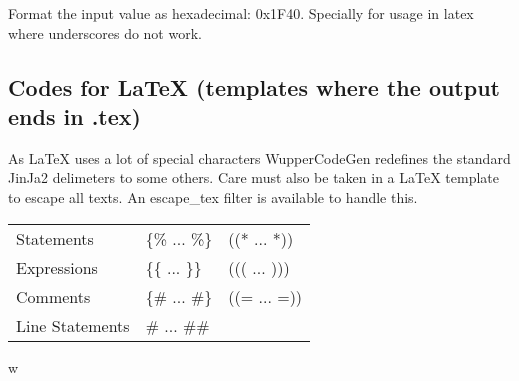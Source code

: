 \documentclass[letterpaper,10pt,english]{sphinxmanual}
\begin{document}
\begin{fulllineitems}
\label{\detokenize{developer:wuppercodegen.filter.xhex}}
Format the input value as hexadecimal: 0x1F40. Specially for usage in latex where underscores do not work.

\end{fulllineitems}



\subsection{Codes for LaTeX (templates where the output ends in .tex)}
\label{\detokenize{developer:codes-for-latex-templates-where-the-output-ends-in-tex}}
As LaTeX uses a lot of special characters WupperCodeGen redefines
the standard JinJa2 delimeters to some others. Care must also be
taken in a LaTeX template to escape all texts. An escape\_tex filter
is available to handle this.

\noindent\begin{tabulary}{\linewidth}{|L|L|L|}
\hline
{}\relax &\relax &\relax \\
\hline
Statements
&
\{\% ... \%\}
&
((* ... *))
\\
\hline
Expressions
&
\{\{ ... \}\}
&
((( ... )))
\\
\hline
Comments
&
\{\# ... \#\}
&
((= ... =))
\\
\hline
Line Statements
&
\#  ... \#\#
&\\
\hline\end{tabulary}



\renewcommand{\indexname}{Python Module Index}
\begin{sphinxtheindex}
\def\bigletter#1{{\Large\sffamily#1}\nopagebreak\vspace{1mm}}
\bigletter{w}
\item {}
\item {}
\item {}
\end{sphinxtheindex}

\renewcommand{\indexname}{Index}
\printindex
\end{document}
